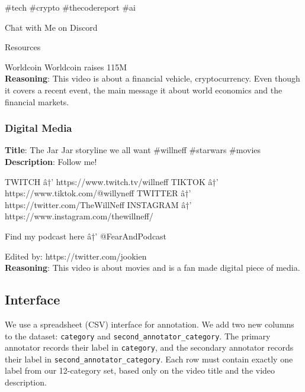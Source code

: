 \documentclass[11pt]{article}
\begin{document}
\#tech \#crypto \#thecodereport \#ai

Chat with Me on Discord

Resources

Worldcoin 
Worldcoin raises 115M  \\
\textbf{Reasoning}: This video is about a financial vehicle, cryptocurrency. Even though it covers a recent event, the main message it about world economics and the financial markets.

\subsubsection{Digital Media}
\textbf{Title}: The Jar Jar storyline we all want \#willneff \#starwars \#movies \\
\textbf{Description}: Follow me!

TWITCH â†’ https://www.twitch.tv/willneff
TIKTOK â†’ https://www.tiktok.com/@willyneff
TWITTER â†’ https://twitter.com/TheWillNeff
INSTAGRAM â†’ https://www.instagram.com/thewillneff/

Find my podcast here â†’ @FearAndPodcast

Edited by:  https://twitter.com/jookien  \\
\textbf{Reasoning}: This video is about movies and is a fan made digital piece of media.

\subsection{Interface}
We use a spreadsheet (CSV) interface for annotation. We add two new columns to the dataset:
\texttt{category} and \texttt{second\_annotator\_category}. The primary annotator records their label in
\texttt{category}, and the secondary annotator records their label in \texttt{second\_annotator\_category}.
Each row must contain exactly one label from our 12-category set, based only on the video title and the video description.
\end{document}
